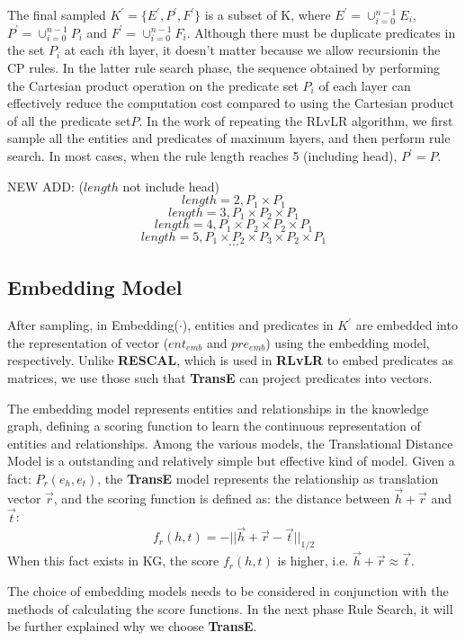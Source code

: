 \documentclass{article}
\begin{document}
	The final sampled $K^{'} = \{E^{'}, P^{'}, F^{'}\}$ is a subset of K, where $E^{'}=\cup^{n-1}_{i=0}E_i$, $P^{'}=\cup^{n-1}_{i=0}P_i$ and $F^{'}=\cup^{n-1}_{i=0}F_i$. 
	Although there must be duplicate predicates in the set $P_i$ at each $i$th layer, it doesn't matter because we allow recursionin the CP rules. In the latter rule search phase, the sequence obtained by performing the Cartesian product operation on the predicate set $P_i$ of each layer can effectively reduce the computation cost compared to using the Cartesian product of all the predicate set$P$.
	In the work of repeating the RLvLR algorithm, we first sample all the entities and predicates of maximum layers, and then perform rule search. In most cases, when the rule length reaches 5 (including head), $P^{'}=P$.
	
	NEW ADD:
	($length$ not include head)
	$$length = 2, P_1\times P_1$$
	$$length = 3, P_1\times P_2\times P_1$$
	$$length = 4, P_1\times P_2\times P_2\times P_1$$
	$$length = 5, P_1\times P_2\times P_3\times P_2\times P_1$$
	$$\cdots$$
	
	\subsection{Embedding Model}
	After sampling, in \textsf{Embedding($\cdot$)}, entities and predicates in $K^{'}$ are embedded into the representation of vector ($ent_{emb}$ and $pre_{emb}$) using the embedding model, respectively. Unlike {\bf RESCAL}, which is used in {\bf RLvLR} to embed predicates as matrices, we use those such that {\bf TransE} can project predicates into vectors.

	The embedding model represents entities and relationships in the knowledge graph, defining a scoring function to learn the continuous representation of entities and relationships. Among the various models, the Translational Distance Model is a outstanding and relatively simple but effective kind of model.
	Given a fact: $P_r(e_h,e_t)$, the {\bf TransE} model represents the relationship as translation vector $\vec{r}$, and the scoring function is defined as: the distance between $\vec{h}+\vec{r}$ and $\vec{t}$: 
	\begin{equation}
	f_r(h, t) = -||\vec{h}+\vec{r} -\vec{t}||_{1/2}
	\label{eq:transe}
	\end{equation}
	When this fact exists in KG, the score $f_r(h,t)$ is higher, i.e. $\vec{h}+\vec{r} \approx \vec{t}$.
	
	The choice of embedding models needs to be considered in conjunction with the methods of calculating the score functions. In the next phase Rule Search, it will be further explained why we choose {\bf TransE}.
	
\end{document}
